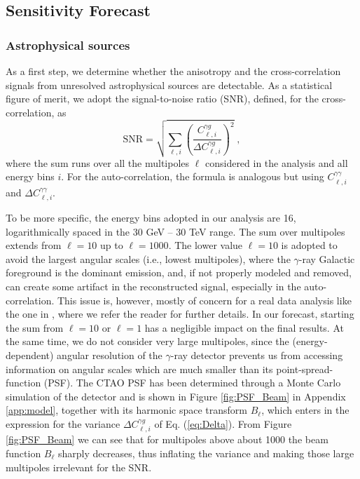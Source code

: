 \subsection{Sensitivity Forecast}\label{sec:sens}


\subsubsection{Astrophysical sources}

As a first step, we determine whether the anisotropy and the cross-correlation signals from unresolved astrophysical sources are detectable. As a statistical figure of merit, we adopt the signal-to-noise ratio (SNR), defined, for the cross-correlation, as
\begin{equation}
    \textrm{SNR} = \sqrt{\sum_{\ell, i} \left(\frac{C_{\ell, i}^{\gamma g}}{\varDelta C_{\ell, i}^{\gamma g}}\right)^2}\;,
    \label{eq:SNR2}
\end{equation}
%
where the sum runs over all the multipoles $\ell$ considered in the analysis and all energy bins $i$. For the auto-correlation, the formula is analogous but using $C_{\ell, i}^{{\gamma \gamma}}$ and $\varDelta C_{\ell,i}^{\gamma \gamma}$.

To be more specific, the energy bins adopted in our analysis are 16, logarithmically spaced in the 30 GeV – 30 TeV range.
The sum over multipoles extends from $\ell = 10$ up to $\ell = 1000$. The lower value $\ell = 10$ is adopted to avoid the largest angular scales (i.e., lowest multipoles),
where the $\gamma$-ray Galactic foreground is the dominant emission, and, if not properly modeled and removed, can create some artifact in the reconstructed signal, especially in the auto-correlation. This issue is, however, mostly of concern for a real data analysis like the one in \cite{Fermi-LAT:2018udj}, where we refer the reader for further details. In our forecast, starting the sum from $\ell=10$ or $\ell=1$ has a negligible impact on the final results.
At the same time, we do not consider very large multipoles, since the (energy-dependent) angular resolution of the $\gamma$-ray detector prevents us from accessing information on angular scales which are much smaller than its point-spread-function (PSF). The CTAO PSF has been determined through a Monte Carlo simulation of the detector and is shown in Figure \ref{fig:PSF_Beam} in Appendix \ref{app:model}, together with its harmonic space transform $B_\ell$, which enters in the expression for the variance $\varDelta C_{\ell, i}^{\gamma g}$ of Eq. (\ref{eq:Delta}). From Figure \ref{fig:PSF_Beam} we can see that for multipoles above about 1000 the beam function $B_\ell$ sharply decreases, thus inflating the variance and making those large multipoles irrelevant for the SNR.


